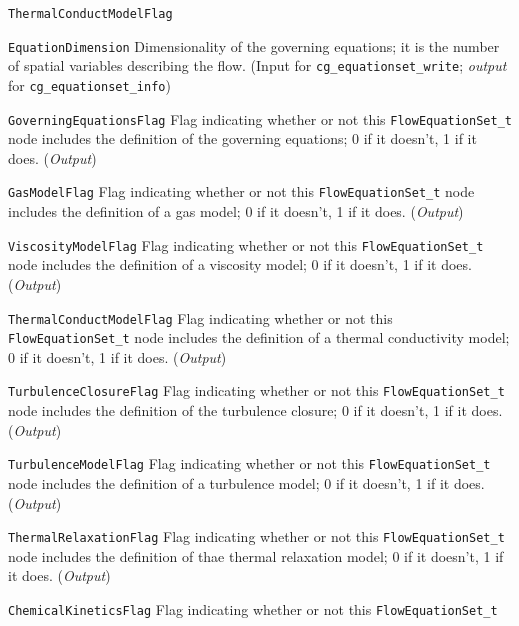 \begin{Ventryi}{\texttt{ThermalConductModelFlag}}\raggedright
\item [\texttt{EquationDimension}]
      Dimensionality of the governing equations; it is the number of
      spatial variables describing the flow.
      (\textcolor{input}{Input} for \texttt{cg\_equationset\_write};
      \textcolor{output}{\textit{output}} for \texttt{cg\_equationset\_info})
\item [\texttt{GoverningEquationsFlag}]
      Flag indicating whether or not this \texttt{FlowEquationSet\_t}
      node includes the definition of the governing equations;
      0 if it doesn't, 1 if it does.
      (\textcolor{output}{\textit{Output}})
\item [\texttt{GasModelFlag}]
      Flag indicating whether or not this \texttt{FlowEquationSet\_t}
      node includes the definition of a gas model;
      0 if it doesn't, 1 if it does.
      (\textcolor{output}{\textit{Output}})
\item [\texttt{ViscosityModelFlag}]
      Flag indicating whether or not this \texttt{FlowEquationSet\_t}
      node includes the definition of a viscosity model;
      0 if it doesn't, 1 if it does.
      (\textcolor{output}{\textit{Output}})
\item [\texttt{ThermalConductModelFlag}]
      Flag indicating whether or not this \texttt{FlowEquationSet\_t}
      node includes the definition of a thermal conductivity model;
      0 if it doesn't, 1 if it does.
      (\textcolor{output}{\textit{Output}})
\item [\texttt{TurbulenceClosureFlag}]
      Flag indicating whether or not this \texttt{FlowEquationSet\_t}
      node includes the definition of the turbulence closure;
      0 if it doesn't, 1 if it does.
      (\textcolor{output}{\textit{Output}})
\item [\texttt{TurbulenceModelFlag}]
      Flag indicating whether or not this \texttt{FlowEquationSet\_t}
      node includes the definition of a turbulence model;
      0 if it doesn't, 1 if it does.
      (\textcolor{output}{\textit{Output}})
\item [\texttt{ThermalRelaxationFlag}]
      Flag indicating whether or not this \texttt{FlowEquationSet\_t}
      node includes the definition of thae thermal relaxation model;
      0 if it doesn't, 1 if it does.
      (\textcolor{output}{\textit{Output}})
\item [\texttt{ChemicalKineticsFlag}]
      Flag indicating whether or not this \texttt{FlowEquationSet\_t}

\end{Ventryi}
